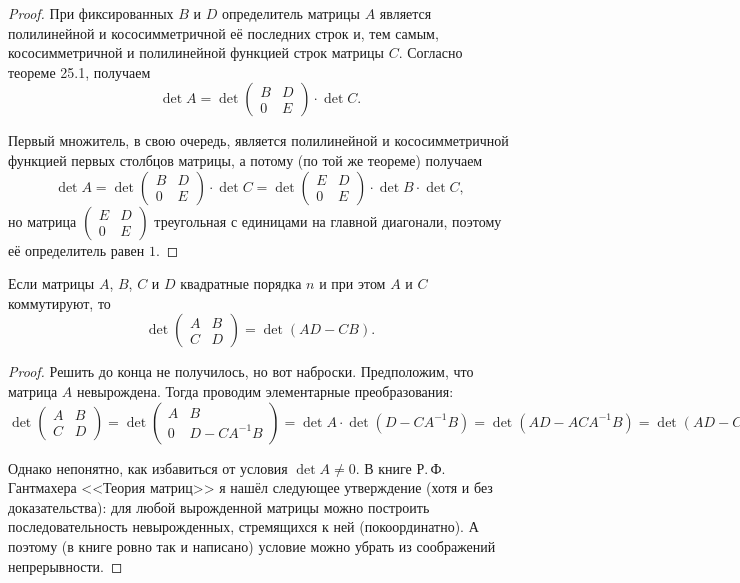 \begin{proof}
    При фиксированных $B$ и $D$ определитель матрицы $A$ является полилинейной и кососимметричной её последних строк и, тем самым, кососимметричной и полилинейной функцией строк матрицы $C$. Согласно теореме 25.1, получаем
    $$
    \det A = \det
    \begin{pmatrix}
        B & D\\
        0 & E
    \end{pmatrix} \cdot \det C.
    $$

    Первый множитель, в свою очередь, является полилинейной и кососимметричной функцией первых столбцов матрицы, а потому (по той же теореме) получаем
    $$
    \det A = \det
    \begin{pmatrix}
        B & D\\
        0 & E
    \end{pmatrix} \cdot \det C = 
    \det 
    \begin{pmatrix}
        E & D\\
        0 & E
    \end{pmatrix} \cdot \det B \cdot \det C,
    $$
    но матрица $
    \begin{pmatrix}
        E & D\\
        0 & E
    \end{pmatrix}
    $ треугольная с единицами на главной диагонали, поэтому её определитель равен $1$.
\end{proof}

\begin{statement}
    Если матрицы $A$, $B$, $C$ и $D$ квадратные порядка $n$ и при этом $A$ и $C$ коммутируют, то
    $$
    \det
    \begin{pmatrix}
        A & B\\
        C & D
    \end{pmatrix} = 
    \det(AD - CB).
    $$
\end{statement}

\begin{proof}
    Решить до конца не получилось, но вот наброски. Предположим, что матрица $A$ невырождена. Тогда проводим элементарные преобразования:
    $$
    \det
    \begin{pmatrix}
        A & B\\
        C & D
    \end{pmatrix} = \det
    \begin{pmatrix}
        A & B\\
        0 & D - CA^{-1}B
    \end{pmatrix} = 
    \det A \cdot \det (D - CA^{-1}B) = \det(AD - ACA^{-1}B) = \det(AD - CB).
    $$

    Однако непонятно, как избавиться от условия $\det A \ne 0$. В книге Р.\,Ф. Гантмахера <<Теория матриц>> я нашёл следующее утверждение (хотя и без доказательства): для любой вырожденной матрицы можно построить последовательность невырожденных, стремящихся к ней (покоординатно). А поэтому (в книге ровно так и написано) условие можно убрать из соображений непрерывности.
\end{proof}


